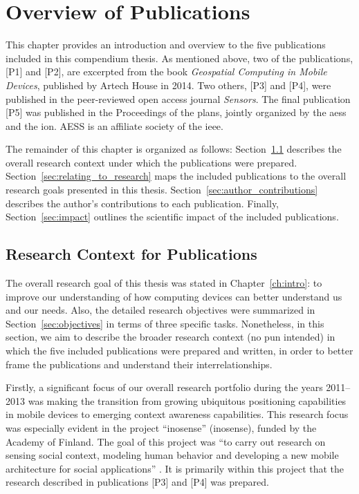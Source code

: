 \chapter{Overview of Publications}
\label{ch:overview_of_publications}

This chapter provides an introduction and overview to the five publications included in this compendium thesis. As mentioned above, two of the publications, [P1] and [P2], are excerpted from the book \emph{Geospatial Computing in Mobile Devices}, published by Artech House in 2014. Two others, [P3] and [P4], were published in the peer-reviewed open access journal \emph{Sensors}. The final publication [P5] was published in the Proceedings of the \gls{plans}, jointly organized by the \gls{aess} and the \gls{ion}. AESS is an affiliate society of the \gls{ieee}.

The remainder of this chapter is organized as follows: Section~\ref{sec:overall_research} describes the overall research context under which the publications were prepared. Section~\ref{sec:relating_to_research} maps the included publications to the overall research goals presented in this thesis. Section~\ref{sec:author_contributions} describes the author's contributions to each publication. Finally, Section~\ref{sec:impact} outlines the scientific impact of the included publications.

\section{Research Context for Publications}
\label{sec:overall_research}

The overall research goal of this thesis was stated in Chapter~\ref{ch:intro}: to improve our understanding of how computing devices can better understand us and our needs. Also, the detailed research objectives were summarized in Section~\ref{sec:objectives} in terms of three specific tasks. Nonetheless, in this section, we aim to describe the broader research context (no pun intended) in which the five included publications were prepared and written, in order to better frame the publications and understand their interrelationships.

Firstly, a significant focus of our overall research portfolio during the years 2011--2013 was making the transition from growing ubiquitous positioning capabilities in mobile devices to emerging context awareness capabilities. This research focus was especially evident in the project ``\acrlong{inosense}'' (\acrshort{inosense}), funded by the Academy of Finland. The goal of this project was ``to carry out research on sensing social context, modeling human behavior and developing a new mobile architecture for social applications'' \cite{inosense2015}. It is primarily within this project that the research described in publications [P3] and [P4] was prepared.


